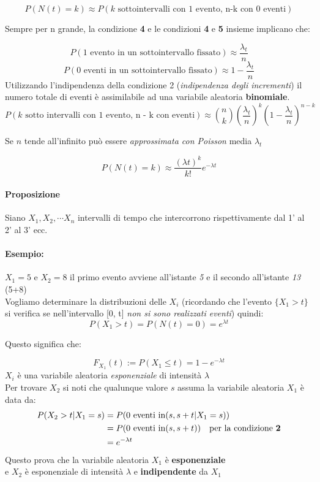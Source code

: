 \documentclass[]{article}
\begin{document}
    \[ P(N(t) = k) \approx P(k \text{ sottointervalli con 1 evento, n-k con 0 eventi}) \]
    \centerline{Sempre per n grande, la condizione \textbf{4} e le condizioni \textbf{4} e \textbf{5} insieme implicano che:}
    \[ P(1 \text{ evento in un sottointervallo fissato}) \approx \frac{\lambda_t}{n} \]
    \[ P(0 \text{ eventi in un sottointervallo fissato}) \approx 1 - \frac{\lambda_t}{n} \]
    Utilizzando l'indipendenza della condizione 2 (\textit{indipendenza degli incrementi}) il numero totale di eventi
    è assimilabile ad una variabile aleatoria \textbf{binomiale}.
    \[ P(k \text{ sotto intervalli con 1 evento, n - k con eventi}) \approx \binom{n}{k} (\frac{\lambda_t}{n})^k (1 - \frac{\lambda_t}{n})^{n-k}  \] 
    \centerline{Se $n$ tende all'infinito può essere \textit{approssimata con Poisson} media $\lambda_t$}
    \[ P(N(t) = k) \approx \frac{(\lambda t)^k}{k!} e^{-\lambda t}\]

    \paragraph{Proposizione} Siano $X_1, X_2, \cdots X_n$ intervalli di tempo che intercorrono rispettivamente dal 1' al 2' al 3' ecc. \\
    \paragraph{Esempio:} $X_1 = 5$ e $X_2 = 8$ il primo evento avviene all'istante \textit{5} e il secondo all'istante \textit{13} (5+8) \\
    Vogliamo determinare la distribuzioni delle $X_i$ (ricordando che l'evento $\{X_1 > t\}$ si verifica se nell'intervallo [0, t] \textit{non si sono realizzati eventi}) quindi:
    \[ P(X_1 > t) = P(N(t) = 0) = e^{\lambda t} \]
    \centerline{Questo significa che:}
    \[ F_{X_1}(t) := P(X_1 \leq t) = 1 - e^{-\lambda t} \]
    $X_i$ è una variabile aleatoria \textit{esponenziale} di intensità $\lambda$ \\
    Per trovare $X_2$ si noti che qualunque valore $s$ assuma la variabile aleatoria $X_1$ è data da:
    \begin{equation*}
        \begin{split}
            P(X_2 > t | X_1 = s) &= P(0 \text{ eventi in} (s, s + t | X_1 = s)) \\
            &= P(0 \text{ eventi in} (s, s + t )) \quad \text{per la condizione \textbf{2}} \\
            &= e^{-\lambda t}
        \end{split}
    \end{equation*}
    Questo prova che la variabile aleatoria $X_1$ è \textbf{esponenziale} \\
    e $X_2$ è esponenziale di intensità $\lambda$ e \textbf{indipendente} da $X_1$ \\
\end{document}
